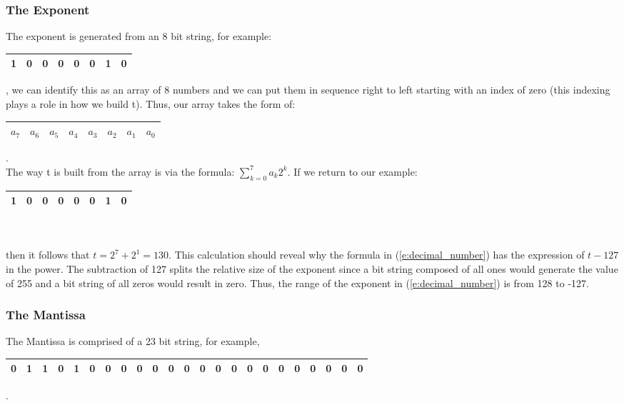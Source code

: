 \documentclass[twoside]{article}
\def\ds{\displaystyle}
\begin{document}
\subsubsection{The Exponent}
The exponent is generated from an 8 bit string, for example: 
\begin{tabular}{|c|c|c|c|c|c|c|c|}
\hline
1 & 0 & 0 & 0 & 0 & 0 & 1 & 0\\
\hline
\end{tabular}, we can identify this as an array of 8 numbers and we can put them in sequence right to left starting with an index of zero (this indexing plays a role in how we build t). Thus, our array takes the form of:\\
\begin{tabular}{|c|c|c|c|c|c|c|c|}
\hline
$a_7$ & $a_6$  & $a_5$  &  $a_4$  &  $a_3$  &  $a_2$  & $a_1$  &  $a_0$ \\
\hline
\end{tabular}.\\
The way t is built from the array is via the formula: $\ds \sum_{k=0}^7 a_k2^k$. If we return to our example: \\
\begin{tabular}{|c|c|c|c|c|c|c|c|}
\hline
1 & 0 & 0 & 0 & 0 & 0 & 1 & 0\\
\hline
\end{tabular}\\ \\
then it follows that $\ds t =  2^7 + 2^1 = 130$. This calculation should reveal why the formula in (\ref{e:decimal_number}) has the expression of $t-127$ in the power. The subtraction of 127 splits the relative size of the exponent since a bit string composed of all ones would generate the value of 255 and a bit string of all zeros would result in zero. Thus, the range of the exponent in (\ref{e:decimal_number}) is from 128 to -127. 

\subsubsection{The Mantissa}
The Mantissa is comprised of a 23 bit string, for example,

\begin{tabular}{|c|c|c|c|c|c|c|c|c|c|c|c|c|c|c|c|c|c|c|c|c|c|c|}
\hline
0 & 1 & 1 & 0 & 1 & 0 & 0 & 0 & 0 & 0 &  0 & 0& 0  & 0 & 0 & 0 & 0 & 0 & 0 & 0 & 0 & 0 & 0\\
\hline
\end{tabular}.\\ 
\end{document}
